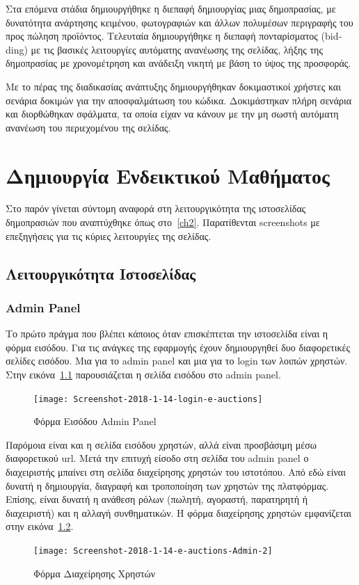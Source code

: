 \documentclass[12pt]{report}
\begin{document}
Στα επόμενα στάδια δημιουργήθηκε η διεπαφή δημιουργίας μιας δημοπρασίας, με δυνατότητα ανάρτησης κειμένου, φωτογραφιών και άλλων πολυμέσων περιγραφής του προς πώληση προϊόντος. Τελευταία δημιουργήθηκε η διεπαφή πονταρίσματος (\textlatin{bidding}) με τις βασικές λειτουργίες αυτόματης ανανέωσης της σελίδας, λήξης της δημοπρασίας με χρονομέτρηση και ανάδειξη νικητή με βάση το ύψος της προσφοράς.

Με το πέρας της διαδικασίας ανάπτυξης δημιουργήθηκαν δοκιμαστικοί χρήστες και σενάρια δοκιμών για την αποσφαλμάτωση του κώδικα. Δοκιμάστηκαν πλήρη σενάρια και διορθώθηκαν σφάλματα, τα οποία είχαν να κάνουν με την μη σωστή αυτόματη ανανέωση του περιεχομένου της σελίδας.

\chapter{Δημιουργία Ενδεικτικού Μαθήματος}\label{ch4}
Στο παρόν γίνεται σύντομη αναφορά στη λειτουργικότητα της ιστοσελίδας δημοπρασιών που αναπτύχθηκε όπως στο~\ref{ch2}. Παρατίθενται \textlatin{screenshots} με επεξηγήσεις για τις κύριες λειτουργίες της σελίδας.

\section{Λειτουργικότητα Ιστοσελίδας}
\subsection{\textlatin{Admin Panel}}
Το πρώτο πράγμα που βλέπει κάποιος όταν επισκέπτεται την ιστοσελίδα είναι η φόρμα εισόδου. Για τις ανάγκες της εφαρμογής έχουν δημιουργηθεί δυο διαφορετικές σελίδες εισόδου. Μια για το \textlatin{admin panel} και μια για το \textlatin{login} των λοιπών χρηστών. Στην εικόνα~\ref{fig:login_1} παρουσιάζεται η σελίδα εισόδου στο \textlatin{admin panel}.
\begin{figure}[H]
\centering
\texttt{[image: Screenshot-2018-1-14-login-e-auctions]}
\caption{Φόρμα Εισόδου \textlatin{Admin Panel}}
\label{fig:login_1}
\end{figure}

Παρόμοια είναι και η σελίδα εισόδου χρηστών, αλλά είναι προσβάσιμη μέσω διαφορετικού \textlatin{url}. Μετά την επιτυχή είσοδο στη σελίδα του \textlatin{admin panel} ο διαχειριστής μπαίνει στη σελίδα διαχείρησης χρηστών του ιστοτόπου. Από εδώ είναι δυνατή η δημιουργία, διαγραφή και τροποποίηση των χρηστών της πλατφόρμας. Επίσης, είναι δυνατή η ανάθεση ρόλων (πωλητή, αγοραστή, παρατηρητή ή διαχειριστή) και η αλλαγή συνθηματικών. Η φόρμα διαχείρησης χρηστών εμφανίζεται στην εικόνα~\ref{fig:user_admin}.
\begin{figure}[H]
\centering
\texttt{[image: Screenshot-2018-1-14-e-auctions-Admin-2]}
\caption{Φόρμα Διαχείρησης Χρηστών}
\label{fig:user_admin}
\end{figure}
\end{document}
